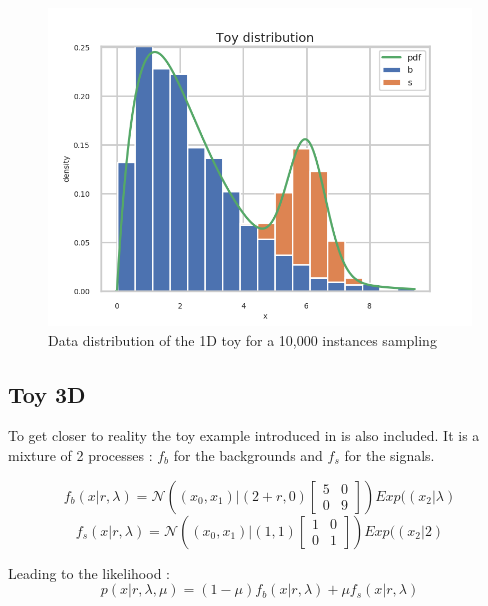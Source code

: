 \begin{figure}[htb]
    \includegraphics[width=\linewidth]{minitoy/distrib.png}
    \caption{Data distribution of the 1D toy for a 10,000 instances sampling}
    \label{fig:minitoy_distrib}
\end{figure}






\subsection{Toy 3D} %
\label{sub:toy_3d}

To get closer to reality the toy example introduced in \cite{DECASTRO2019170inferno} is also included.
It is a mixture of 2 processes : $f_b$ for the backgrounds and $f_s$ for the signals.

\begin{equation}
	f_b (x|r, \lambda) = \mathcal N \left ( (x_0, x_1) | (2+r, 0) 
	\begin{bmatrix} 5 & 0 \\ 0 & 9 \end{bmatrix} \right ) Exp((x_2| \lambda)
\end{equation}
\begin{equation}
	f_s (x|r, \lambda) = \mathcal N \left ( (x_0, x_1) | (1, 1) 
	\begin{bmatrix} 1 & 0 \\ 0 & 1 \end{bmatrix} \right ) Exp((x_2| 2)
\end{equation}

Leading to the likelihood :
\begin{equation}
	p(x | r, \lambda, \mu ) = (1-\mu) f_b(x|r, \lambda) + \mu f_s(x|r, \lambda)
\end{equation}

